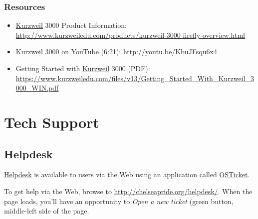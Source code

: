 \documentclass[letterpaper,10pt,english]{sphinxmanual}
\begin{document}
\subsection{Resources}
\label{kurzweil:resources}\begin{itemize}
\item {} 
\href{http://www.kurzweiledu.com/products/kurzweil-3000-firefly-overview.html}{Kurzweil} 3000 Product Information: \href{http://www.kurzweiledu.com/products/kurzweil-3000-firefly-overview.html}{http://www.kurzweiledu.com/products/kurzweil-3000-firefly-overview.html}

\item {} 
\href{http://www.kurzweiledu.com/products/kurzweil-3000-firefly-overview.html}{Kurzweil} 3000 on YouTube (6:21): \href{http://youtu.be/KbuJFsqu6x4}{http://youtu.be/KbuJFsqu6x4}

\item {} 
Getting Started with \href{http://www.kurzweiledu.com/products/kurzweil-3000-firefly-overview.html}{Kurzweil} 3000 (PDF): \href{https://www.kurzweiledu.com/files/v13/Getting\_Started\_With\_Kurzweil\_3000\_WIN.pdf}{https://www.kurzweiledu.com/files/v13/Getting\_Started\_With\_Kurzweil\_3000\_WIN.pdf}

\end{itemize}


\chapter{Tech Support}
\label{helpdesk::doc}\label{helpdesk:tech-support}\label{helpdesk:index-0}\label{helpdesk:kurzweil}

\section{Helpdesk}
\label{helpdesk:helpdesk}
\href{http://chelseapride.org/helpdesk/}{Helpdesk} is available to users via the Web using an application called \href{http://chelseapride.org/helpdesk/}{OSTicket}.

To get help via the Web, browse to \href{http://chelseapride.org/helpdesk/}{http://chelseapride.org/helpdesk/}. When the page loads, you'll have an opportunity to \emph{Open a new ticket} (green button, middle-left side of the page.
\end{document}
